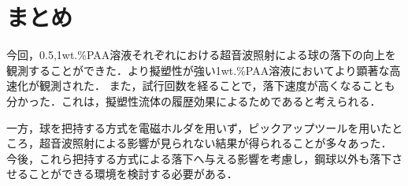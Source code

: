\clearpage
\section{まとめ}

今回，0.5,1wt.\%PAA溶液それぞれにおける超音波照射による球の落下の向上を観測することができた．より擬塑性が強い1wt.\%PAA溶液においてより顕著な高速化が観測された．
また，試行回数を経ることで，落下速度が高くなることも分かった．これは，擬塑性流体の履歴効果によるためであると考えられる．

一方，球を把持する方式を電磁ホルダを用いず，ピックアップツールを用いたところ，超音波照射による影響が見られない結果が得られることが多々あった．
今後，これら把持する方式による落下へ与える影響を考慮し，鋼球以外も落下させることができる環境を検討する必要がある．
